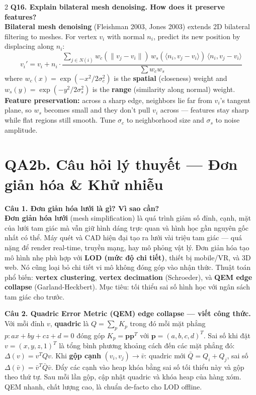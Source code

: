 \begin{paracol}{2}
\textbf{Q16. Explain bilateral mesh denoising. How does it preserve features?}\\
\textbf{Bilateral mesh denoising} (Fleishman 2003, Jones 2003) extends 2D bilateral filtering to meshes. For vertex $v_i$ with normal $n_i$, predict its new position by displacing along $n_i$:
\[
v_i' = v_i + n_i \cdot \frac{\sum_{j\in N(i)} w_c(\|v_j-v_i\|)\, w_s(\langle n_i, v_j-v_i\rangle)\,\langle n_i, v_j-v_i\rangle}{\sum w_c w_s}
\]
where $w_c(x)=\exp(-x^2/2\sigma_c^2)$ is the \textbf{spatial} (closeness) weight and $w_s(y)=\exp(-y^2/2\sigma_s^2)$ is the \textbf{range} (similarity along normal) weight. \textbf{Feature preservation:} across a sharp edge, neighbors lie far from $v_i$'s tangent plane, so $w_s$ becomes small and they don't pull $v_i$ across — features stay sharp while flat regions still smooth. Tune $\sigma_c$ to neighborhood size and $\sigma_s$ to noise amplitude.

\switchcolumn

\section*{QA2b. Câu hỏi lý thuyết — Đơn giản hóa \& Khử nhiễu}

\textbf{Câu 1. Đơn giản hóa lưới là gì? Vì sao cần?}\\
\textbf{Đơn giản hóa lưới} (mesh simplification) là quá trình giảm số đỉnh, cạnh, mặt của lưới tam giác mà vẫn giữ hình dáng trực quan và hình học gần nguyên gốc nhất có thể. Máy quét và CAD hiện đại tạo ra lưới vài triệu tam giác — quá nặng để render real-time, truyền mạng, hay mô phỏng vật lý. Đơn giản hóa tạo mô hình nhẹ phù hợp với \textbf{LOD (mức độ chi tiết)}, thiết bị mobile/VR, và 3D web. Nó cũng loại bỏ chi tiết vi mô không đóng góp vào nhận thức. Thuật toán phổ biến: \textbf{vertex clustering}, \textbf{vertex decimation} (Schroeder), và \textbf{QEM edge collapse} (Garland-Heckbert). Mục tiêu: tối thiểu sai số hình học với ngân sách tam giác cho trước.

\textbf{Câu 2. Quadric Error Metric (QEM) edge collapse — viết công thức.}\\
Với mỗi đỉnh $v$, \textbf{quadric} là $Q = \sum_{p} K_p$ trong đó mỗi mặt phẳng $p: ax+by+cz+d=0$ đóng góp $K_p = \mathbf{p}\mathbf{p}^T$ với $\mathbf{p}=(a,b,c,d)^T$. Sai số khi đặt $v=(x,y,z,1)^T$ là tổng bình phương khoảng cách đến các mặt phẳng đó: $\Delta(v) = v^T Q v$. Khi \textbf{gộp cạnh} $(v_i,v_j)\to\bar v$: quadric mới $\bar Q = Q_i + Q_j$, sai số $\Delta(\bar v)=\bar v^T \bar Q \bar v$. Đẩy các cạnh vào heap khóa bằng sai số tối thiểu này và gộp theo thứ tự. Sau mỗi lần gộp, cập nhật quadric và khóa heap của hàng xóm. QEM nhanh, chất lượng cao, là chuẩn de-facto cho LOD offline.


\end{paracol}
